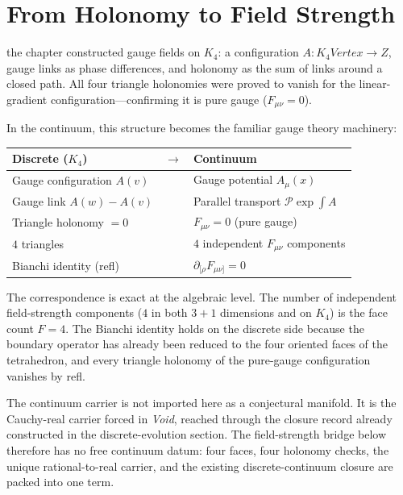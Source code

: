 \documentclass[11pt,a4paper]{book}
\def\mathbb#1{#1}%
\def\texttt#1{#1}%
\def\text#1{#1}%
\begin{document}
\section{From Holonomy to Field Strength}
\label{sec:holonomy-to-field-strength}

the chapter \emph{} constructed gauge fields on $K_4$: a configuration $A : K_4\text{Vertex} \to \mathbb{Z}$, gauge links as phase differences, and holonomy as the sum of links around a closed path. All four triangle holonomies were proved to vanish for the linear-gradient configuration---confirming it is pure gauge ($F_{\mu\nu} = 0$).

In the continuum, this structure becomes the familiar gauge theory machinery:

\begin{center}
\begin{tabular}{lcl}
\toprule
Discrete ($K_4$) & $\longrightarrow$ & Continuum \\
\midrule
Gauge configuration $A(v)$ & & Gauge potential $A_\mu(x)$ \\
Gauge link $A(w) - A(v)$ & & Parallel transport $\mathcal{P}\exp\!\int A$ \\
Triangle holonomy $= 0$ & & $F_{\mu\nu} = 0$ (pure gauge) \\
$4$ triangles & & $4$ independent $F_{\mu\nu}$ components \\
Bianchi identity (\texttt{refl}) & & $\partial_{[\rho} F_{\mu\nu]} = 0$ \\
\bottomrule
\end{tabular}
\end{center}

The correspondence is exact at the algebraic level. The number of independent field-strength components ($4$ in both $3+1$ dimensions and on $K_4$) is the face count $F = 4$. The Bianchi identity holds on the discrete side because the boundary operator has already been reduced to the four oriented faces of the tetrahedron, and every triangle holonomy of the pure-gauge configuration vanishes by \texttt{refl}.

The continuum carrier is not imported here as a conjectural manifold. It is the Cauchy-real carrier forced in \textit{Void}, reached through the closure record already constructed in the discrete-evolution section. The field-strength bridge below therefore has no free continuum datum: four faces, four holonomy checks, the unique rational-to-real carrier, and the existing discrete-continuum closure are packed into one term.
\end{document}
